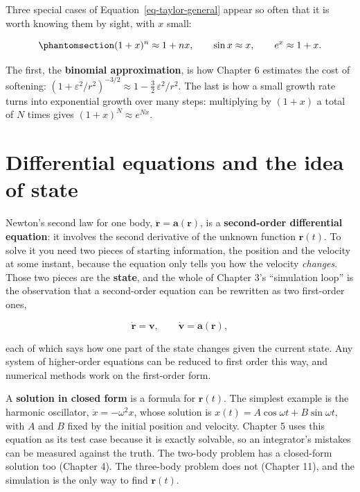 \documentclass[
  10.5pt,
  letterpaper,
]{scrbook}
\theoremstyle{definition}
\theoremstyle{plain}
\theoremstyle{remark}
\begin{document}
Three special cases of Equation~\ref{eq-taylor-general} appear so often
that it is worth knowing them by sight, with \(x\) small:

\begin{equation}\protect\phantomsection\label{eq-common-approximations}{
(1 + x)^n \approx 1 + nx, \qquad \sin x \approx x, \qquad e^x \approx 1 + x.
}\end{equation}

The first, the \textbf{binomial approximation}, is how Chapter 6
estimates the cost of softening:
\((1 + \varepsilon^2/r^2)^{-3/2} \approx 1 - \tfrac32\,\varepsilon^2/r^2\).
The last is how a small growth rate turns into exponential growth over
many steps: multiplying by \((1 + x)\) a total of \(N\) times gives
\((1+x)^N \approx e^{Nx}\).

\section{Differential equations and the idea of
state}\label{differential-equations-and-the-idea-of-state}

Newton's second law for one body,
\(\ddot{\mathbf{r}} = \mathbf{a}(\mathbf{r})\), is a
\textbf{second-order differential equation}: it involves the second
derivative of the unknown function \(\mathbf{r}(t)\). To solve it you
need two pieces of starting information, the position and the velocity
at some instant, because the equation only tells you how the velocity
\emph{changes}. Those two pieces are the \textbf{state}, and the whole
of Chapter 3's ``simulation loop'' is the observation that a
second-order equation can be rewritten as two first-order ones,

\[
\dot{\mathbf{r}} = \mathbf{v}, \qquad \dot{\mathbf{v}} = \mathbf{a}(\mathbf{r}),
\]

each of which says how one part of the state changes given the current
state. Any system of higher-order equations can be reduced to first
order this way, and numerical methods work on the first-order form.

A \textbf{solution in closed form} is a formula for \(\mathbf{r}(t)\).
The simplest example is the harmonic oscillator,
\(\ddot x = -\omega^2 x\), whose solution is
\(x(t) = A\cos\omega t + B\sin\omega t\), with \(A\) and \(B\) fixed by
the initial position and velocity. Chapter 5 uses this equation as its
test case because it is exactly solvable, so an integrator's mistakes
can be measured against the truth. The two-body problem has a
closed-form solution too (Chapter 4). The three-body problem does not
(Chapter 11), and the simulation is the only way to find
\(\mathbf{r}(t)\).
\end{document}
